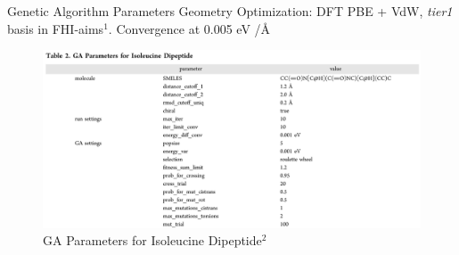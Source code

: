 \documentclass[10pt]{beamer}
\begin{document}
{%
\begin{frame}[fragile]{Genetic Algorithm Parameters}
	Geometry Optimization: DFT PBE + VdW, \emph{tier1} basis in FHI-aims$^1$.
	Convergence at 0.005 eV /\AA{}
	\begin{figure}
		\includegraphics[width=\linewidth, trim={0 0 0 1.2cm},clip]{images/Params.png}
		\caption*{GA Parameters for Isoleucine Dipeptide$^2$}
	\end{figure}
\end{frame}
}
\end{document}
